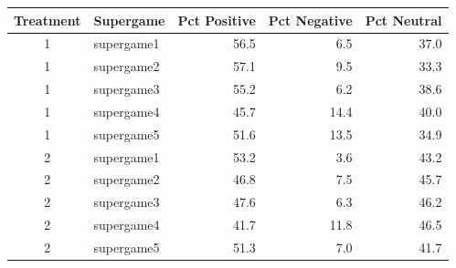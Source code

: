 \begin{tabular}{clrrr}
  \toprule
  Treatment & Supergame & Pct Positive & Pct Negative & Pct Neutral \\ 
  \midrule
  1 & supergame1 & 56.5 & 6.5 & 37.0 \\ 
  1 & supergame2 & 57.1 & 9.5 & 33.3 \\ 
  1 & supergame3 & 55.2 & 6.2 & 38.6 \\ 
  1 & supergame4 & 45.7 & 14.4 & 40.0 \\ 
  1 & supergame5 & 51.6 & 13.5 & 34.9 \\ 
  2 & supergame1 & 53.2 & 3.6 & 43.2 \\ 
  2 & supergame2 & 46.8 & 7.5 & 45.7 \\ 
  2 & supergame3 & 47.6 & 6.3 & 46.2 \\ 
  2 & supergame4 & 41.7 & 11.8 & 46.5 \\ 
  2 & supergame5 & 51.3 & 7.0 & 41.7 \\ 
  \bottomrule
\end{tabular}
